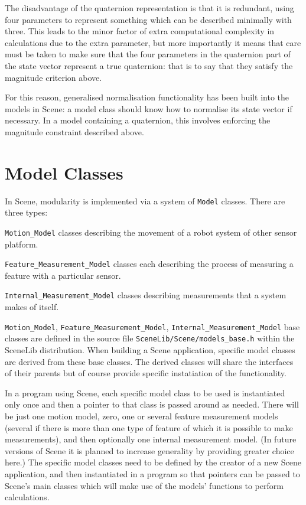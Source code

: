 \documentclass{article}
\begin{document}
\ei

The disadvantage of the quaternion representation is that it is
redundant, using four parameters to represent something which can be
described minimally with three. This leads to the minor factor of
extra computational complexity in calculations due to the extra
parameter, but more importantly it means that care must be taken to
make sure that the four parameters in the quaternion part of the state
vector represent a true quaternion: that is to say that they satisfy
the magnitude criterion above.

For this reason, generalised normalisation functionality has been
built into the models in Scene: a model class should know how to
normalise its state vector if necessary. In a model containing a
quaternion, this involves enforcing the magnitude constraint described
above.

\section{Model Classes}

In Scene, modularity is implemented via a system of {\tt Model}
classes. There are three types:
\be
\item {\tt Motion\_Model} classes describing the movement of a
robot system of other sensor platform. 
\item {\tt Feature\_Measurement\_Model} classes each describing the
process of measuring a feature with a particular sensor. 
\item {\tt Internal\_Measurement\_Model} classes describing
measurements that a system makes of itself.
\ee

{\tt Motion\_Model}, {\tt Feature\_Measurement\_Model},
{\tt Internal\_Measurement\_Model} base classes are defined in the source file
{\tt SceneLib/Scene/models\_base.h} within the SceneLib
distribution. When building a Scene application, specific model
classes are derived from these base classes. The derived classes will
share the interfaces of their parents but of course provide specific
instatiation of the functionality.


In a program using Scene, each specific model class to be used is
instantiated only once and then a pointer to that class is passed
around as needed. There will be just one motion model,
zero, one or several feature measurement models (several if there is more
than one type of feature of which it is possible to make
measurements), and then optionally one internal measurement model. (In
future versions of Scene it is planned to increase generality by
providing greater choice here.) The specific model classes need to be 
defined by the creator of a new Scene application, and then
instantiated in a program so that pointers can be passed to Scene's
main classes which will make use of the models' functions to perform
calculations.
\end{document}
